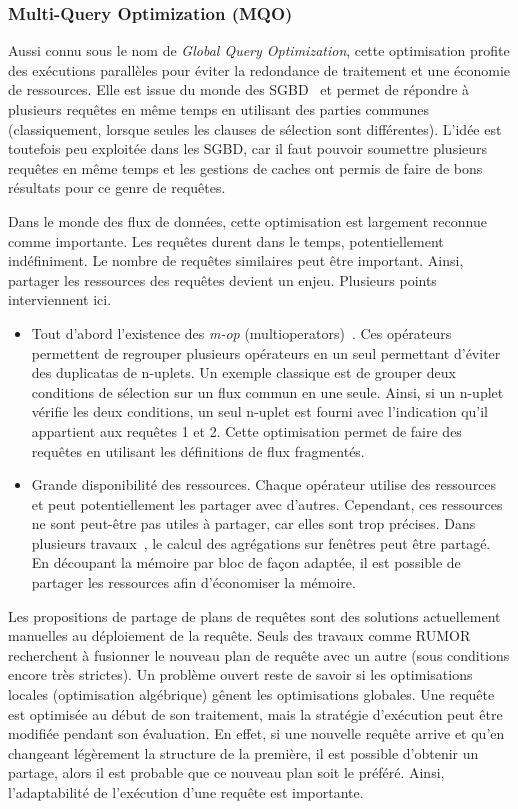 \subsubsection{Multi-Query Optimization (MQO)}
Aussi connu sous le nom de \textit{Global Query Optimization}, cette optimisation profite des exécutions parallèles pour éviter la redondance de traitement et une économie de ressources. Elle est issue du monde des SGBD~\cite{Sellis:mqo} et permet de répondre à plusieurs requêtes en même temps en utilisant des parties communes (classiquement, lorsque seules les clauses de sélection sont différentes). L'idée est toutefois peu exploitée dans les SGBD, car il faut pouvoir soumettre plusieurs requêtes en même temps et les gestions de caches ont permis de faire de bons résultats pour ce genre de requêtes.

Dans le monde des flux de données, cette optimisation est largement reconnue comme importante. Les requêtes durent dans le temps, potentiellement indéfiniment. Le nombre de requêtes similaires peut être important. Ainsi, partager les ressources des requêtes devient un enjeu. Plusieurs points interviennent ici.
\begin{itemize}
 \item Tout d'abord l'existence des \textit{m-op} (multioperators)~\cite{Hong:mqo}. Ces opérateurs permettent de regrouper plusieurs opérateurs en un seul permettant d'éviter des duplicatas de n-uplets. Un exemple classique est de grouper deux conditions de sélection sur un flux commun en une seule. Ainsi, si un n-uplet vérifie les deux conditions, un seul n-uplet est fourni avec l'indication qu'il appartient aux requêtes 1 et 2. Cette optimisation permet de faire des requêtes en utilisant les définitions de flux fragmentés.
 \item Grande disponibilité des ressources. Chaque opérateur utilise des ressources et peut potentiellement les partager avec d'autres. Cependant, ces ressources ne sont peut-être pas utiles à partager, car elles sont trop précises. Dans plusieurs travaux~\cite{Arasu:resource}, le calcul des agrégations sur fenêtres peut être partagé. En découpant la mémoire par bloc de façon adaptée, il est possible de partager les ressources afin d'économiser la mémoire.
\end{itemize}

Les propositions de partage de plans de requêtes sont des solutions actuellement manuelles au déploiement de la requête. Seuls des travaux comme RUMOR~\cite{Hong:mqo} recherchent à fusionner le nouveau plan de requête avec un autre (sous conditions encore très strictes). Un problème ouvert reste de savoir si les optimisations locales (optimisation algébrique) gênent les optimisations globales. Une requête est optimisée au début de son traitement, mais la stratégie d'exécution peut être modifiée pendant son évaluation. En effet, si une nouvelle requête arrive et qu'en changeant légèrement la structure de la première, il est possible d'obtenir un partage, alors il est probable que ce nouveau plan soit le préféré. Ainsi, l'adaptabilité de l'exécution d'une requête est importante.

